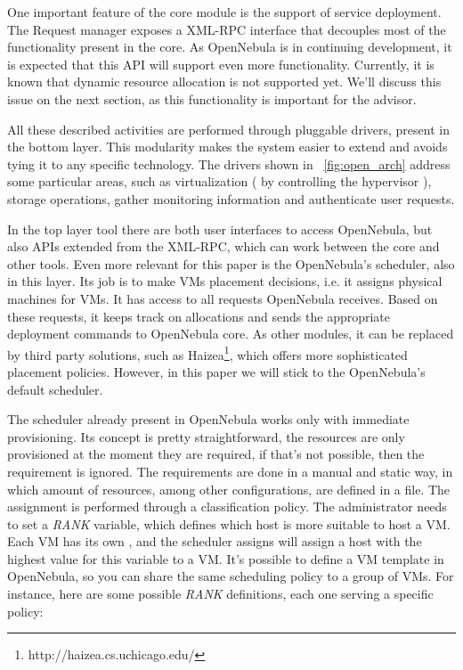One important feature of the core module is the support of service deployment. The Request manager exposes a XML-RPC interface that decouples most of the functionality present in the core. As OpenNebula is in continuing development, it is expected that this API will support even more functionality. Currently, it is known that dynamic resource allocation is not supported yet. We'll discuss this issue on the next section, as this functionality is important for the advisor.

All these described activities are performed through pluggable drivers, present in the bottom layer. This modularity makes the system easier to extend and avoids tying it to any specific technology. The drivers shown in ~\ref{fig:open_arch}  address some particular areas, such as virtualization ( by controlling the hypervisor ), storage operations, gather monitoring information and authenticate user requests.

In the top layer tool there are both user interfaces to access OpenNebula, but also APIs extended from the XML-RPC, which can work between the core and other tools. Even more relevant for this paper is the OpenNebula's scheduler, also in this layer. Its job is to make VMs placement decisions, i.e. it assigns physical machines for VMs. It has access to all requests OpenNebula receives. Based on these requests, it keeps track on allocations and sends the appropriate deployment commands to OpenNebula core. As other modules, it can be replaced by third party solutions, such as Haizea\footnote{http://haizea.cs.uchicago.edu/},  which offers more sophisticated placement policies. However, in this paper we will stick to the OpenNebula's default scheduler.

The scheduler already present in OpenNebula works only with immediate provisioning. Its concept is pretty straightforward, the resources are only provisioned at the moment they are required, if that's not possible, then the requirement is ignored. The requirements are done in a manual and static way, in which amount of resources, among other configurations, are defined in a file. The assignment is performed through a classification policy.  The administrator needs to set a \textit{RANK} variable, which defines which host is more suitable to host a VM. Each VM has its own , and the scheduler assigns will assign a host with the highest value for this variable to a VM. It's possible to define a VM template in OpenNebula, so you can share the same scheduling policy  to a group of VMs. For instance, here are some possible \textit{RANK} definitions, each one serving a specific policy:

